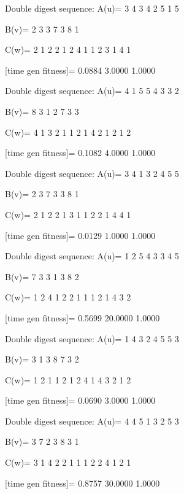 Double digest sequence:
A(u)=
     3     4     3     4     2     5     1     5

B(v)=
     2     3     3     7     3     8     1

C(w)=
     2     1     2     2     1     2     4     1     1     2     3     1     4     1

[time gen fitness]=
    0.0884    3.0000    1.0000

Double digest sequence:
A(u)=
     4     1     5     5     4     3     3     2

B(v)=
     8     3     1     2     7     3     3

C(w)=
     4     1     3     2     1     1     2     1     4     2     1     2     1     2

[time gen fitness]=
    0.1082    4.0000    1.0000

Double digest sequence:
A(u)=
     3     4     1     3     2     4     5     5

B(v)=
     2     3     7     3     3     8     1

C(w)=
     2     1     2     2     1     3     1     1     2     2     1     4     4     1

[time gen fitness]=
    0.0129    1.0000    1.0000

Double digest sequence:
A(u)=
     1     2     5     4     3     3     4     5

B(v)=
     7     3     3     1     3     8     2

C(w)=
     1     2     4     1     2     2     1     1     1     2     1     4     3     2

[time gen fitness]=
    0.5699   20.0000    1.0000

Double digest sequence:
A(u)=
     1     4     3     2     4     5     5     3

B(v)=
     3     1     3     8     7     3     2

C(w)=
     1     2     1     1     2     1     2     4     1     4     3     2     1     2

[time gen fitness]=
    0.0690    3.0000    1.0000

Double digest sequence:
A(u)=
     4     4     5     1     3     2     5     3

B(v)=
     3     7     2     3     8     3     1

C(w)=
     3     1     4     2     2     1     1     1     2     2     4     1     2     1

[time gen fitness]=
    0.8757   30.0000    1.0000

